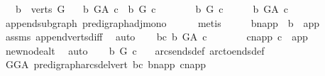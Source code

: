 \begin{isabellebody}
\ \ \ {\isachardoublequoteopen}b\ {\isasymin}\ verts\ G{\isachardoublequoteclose}\isanewline
\ \ \ {\isachardoublequoteopen}b\ {\isasymrightarrow}\isactrlbsub G{\isacharunderscore}{\kern0pt}A\isactrlesub \ c\ {\isasymlongleftrightarrow}\ b\ {\isasymrightarrow}\isactrlbsub G\isactrlesub \ c{\isachardoublequoteclose}\isanewline
%
\isadelimproof
%
\endisadelimproof
%
\isatagproof
{}\isamarkupfalse%
\ \ \isanewline
\ \ \isamarkupfalse%
\ {\isachardoublequoteopen}\ b\ {\isasymrightarrow}\isactrlbsub G\isactrlesub \ c{\isachardoublequoteclose}\isanewline
\ \ \isamarkupfalse%
\ \isamarkupfalse%
\ {\isachardoublequoteopen}b\ {\isasymrightarrow}\isactrlbsub G{\isacharunderscore}{\kern0pt}A\isactrlesub \ c{\isachardoublequoteclose}\isanewline
\ \ \ \ \isamarkupfalse%
\ append{\isacharunderscore}{\kern0pt}subgraph\ pre{\isacharunderscore}{\kern0pt}digraph{\isachardot}{\kern0pt}adj{\isacharunderscore}{\kern0pt}mono\isanewline
\ \ \ \ \isamarkupfalse%
\ metis\isanewline
{}\isamarkupfalse%
\ \isanewline
\ \ \isamarkupfalse%
\ b{\isacharunderscore}{\kern0pt}napp\ {\isacharcolon}{\kern0pt}\ {\isachardoublequoteopen}b\ {\isasymnoteq}\ app{\isachardoublequoteclose}\ \isamarkupfalse%
\ assms{\isacharparenleft}{\kern0pt}{}{\isacharparenright}{\kern0pt}\ append{\isacharunderscore}{\kern0pt}verts{\isacharunderscore}{\kern0pt}diff\ \isamarkupfalse%
\ auto\isanewline
\ \ \isamarkupfalse%
\ bc{\isacharcolon}{\kern0pt}\ {\isachardoublequoteopen}b\ {\isasymrightarrow}\isactrlbsub G{\isacharunderscore}{\kern0pt}A\isactrlesub \ c{\isachardoublequoteclose}\ \isanewline
\ \ \isamarkupfalse%
\ \isamarkupfalse%
\ \ c{\isacharunderscore}{\kern0pt}napp{\isacharcolon}{\kern0pt}\ {\isachardoublequoteopen}c\ {\isasymnoteq}\ app{\isachardoublequoteclose}\ \isamarkupfalse%
\ new{\isacharunderscore}{\kern0pt}node{\isacharunderscore}{\kern0pt}alt\ \isamarkupfalse%
\ auto\isanewline
\ \ \isamarkupfalse%
\ {\isachardoublequoteopen}b\ {\isasymrightarrow}\isactrlbsub G\isactrlesub \ c{\isachardoublequoteclose}\ \ \isamarkupfalse%
\ arcs{\isacharunderscore}{\kern0pt}ends{\isacharunderscore}{\kern0pt}def\ arc{\isacharunderscore}{\kern0pt}to{\isacharunderscore}{\kern0pt}ends{\isacharunderscore}{\kern0pt}def\isanewline
\ \ \ \ \ \ \isamarkupfalse%
\ GG{\isacharunderscore}{\kern0pt}A\ pre{\isacharunderscore}{\kern0pt}digraph{\isachardot}{\kern0pt}arcs{\isacharunderscore}{\kern0pt}del{\isacharunderscore}{\kern0pt}vert\ bc\ b{\isacharunderscore}{\kern0pt}napp\ c{\isacharunderscore}{\kern0pt}napp\isanewline

\end{isabellebody}
